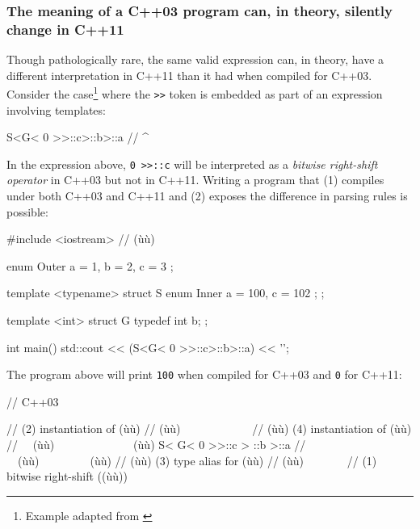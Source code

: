 \subsubsection[The meaning of a C++03 program can, in theory, silently change in C++11]{The meaning of a C++03 program can, in theory, silently change in C++11}\label{the-meaning-of-a-c++03-program-can-(in-theory)-silently-change-in-c++11}

Though pathologically rare, the same valid expression can, in theory, have a different interpretation in C++11 than it had when compiled for C++03.
Consider the case{\cprotect\footnote{Example adapted from \cite{gustedt13}}} where the
\lstinline!>>! token is embedded as part of an expression involving
templates:

\begin{emcppslisting}[emcppsignore={Pathological}]
S<G< 0 >>::c>::b>::a
//   ^~~~~~~
\end{emcppslisting}

\noindent In the expression above, \lstinline!0!~\lstinline!>>::c! will be interpreted
as a \emph{bitwise right-shift operator} in C++03 but not in C++11. Writing a program that (1) compiles under both C++03 and
C++11 and (2) exposes the difference in parsing rules is possible:

\begin{emcppshiddenlisting}[emcppsbatch=e4]
#include <iostream>    // (ù{}ù)
\end{emcppshiddenlisting}
\begin{emcppslisting}[emcppsbatch=e4]
enum Outer { a = 1, b = 2, c = 3 };

template <typename> struct S
{
    enum Inner { a = 100, c = 102 };
};

template <int> struct G
{
    typedef int b;
};

int main()
{
    std::cout << (S<G< 0 >>::c>::b>::a) << '\n';
}
\end{emcppslisting}

\noindent The program above will print \lstinline!100! when compiled for C++03 and
\lstinline!0! for C++11:

\begin{emcppslisting}[emcppsignore={Pathological}]
// C++03

//     (2) instantiation of (ù{}ù)
//    (ù{\codeincomments{$\|$}}ù)~~~~~~~~~~~~
//    (ù{\codeincomments{$\|\:\,|\:\,\|$}}ù)   (4) instantiation of (ù{}ù)
//  ~~(ù{\codeincomments{$\|\downarrow\|$}}ù)~~~~~~~~~~~~~~(ù{\codeincomments{$\downarrow$}}ù)
    S< G< 0 >>::c > ::b >::a
//    ~~(ù{\codeincomments{$\|\,\,\uparrow\,\,\|$}}ù)~~~~~~~~~(ù{\codeincomments{$\uparrow$}}ù)
//      (ù{\codeincomments{$\|\:\,\,\,|\:\,\,\,\|$}}ù) (3) type alias for (ù{}ù)
//      (ù{\codeincomments{$\|$}}ù)~~~~~~~
// (1) bitwise right-shift ((ù{}ù))
\end{emcppslisting}


